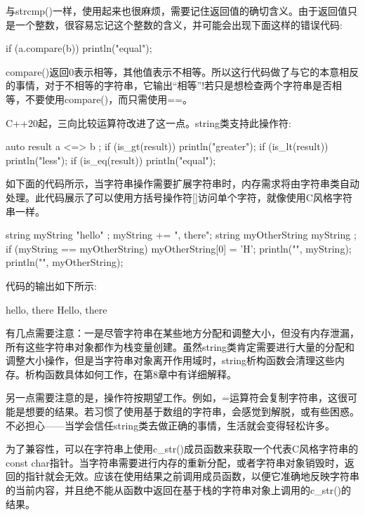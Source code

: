 与strcmp()一样，使用起来也很麻烦，需要记住返回值的确切含义。由于返回值只是一个整数，很容易忘记这个整数的含义，并可能会出现下面这样的错误代码:

\begin{cpp}
if (a.compare(b)) { println("equal"); }
\end{cpp}

compare()返回0表示相等，其他值表示不相等。所以这行代码做了与它的本意相反的事情，对于不相等的字符串，它输出“相等”!若只是想检查两个字符串是否相等，不要使用compare()，而只需使用==。

C++20起，三向比较运算符改进了这一点。string类支持此操作符:

\begin{cpp}
auto result { a <=> b };
if (is_gt(result)) { println("greater"); }
if (is_lt(result)) { println("less"); }
if (is_eq(result)) { println("equal"); }
\end{cpp}


如下面的代码所示，当字符串操作需要扩展字符串时，内存需求将由字符串类自动处理。此代码展示了可以使用方括号操作符[]访问单个字符，就像使用C风格字符串一样。

\begin{cpp}
string myString { "hello" };
myString += ", there";
string myOtherString { myString };
if (myString == myOtherString) {
    myOtherString[0] = 'H';
}
println("{}", myString);
println("{}", myOtherString);
\end{cpp}

代码的输出如下所示:

\begin{shell}
hello, there
Hello, there
\end{shell}

有几点需要注意：一是尽管字符串在某些地方分配和调整大小，但没有内存泄漏，所有这些字符串对象都作为栈变量创建。虽然string类肯定需要进行大量的分配和调整大小操作，但是当字符串对象离开作用域时，string析构函数会清理这些内存。析构函数具体如何工作，在第8章中有详细解释。

另一点需要注意的是，操作符按期望工作。例如，=运算符会复制字符串，这很可能是想要的结果。若习惯了使用基于数组的字符串，会感觉到解脱，或有些困惑。不必担心——当学会信任string类去做正确的事情，生活就会变得轻松许多。


为了兼容性，可以在字符串上使用c\_str()成员函数来获取一个代表C风格字符串的const char指针。当字符串需要进行内存的重新分配，或者字符串对象销毁时，返回的指针就会无效。应该在使用结果之前调用成员函数，以便它准确地反映字符串的当前内容，并且绝不能从函数中返回在基于栈的字符串对象上调用的c\_str()的结果。

